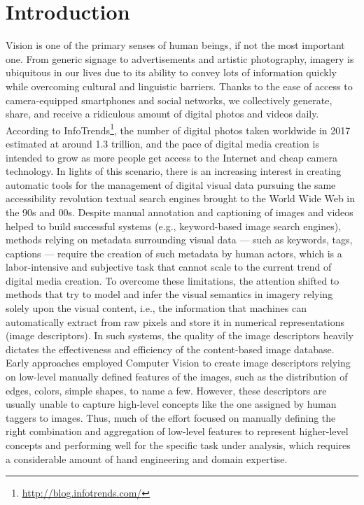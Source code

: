 
\chapter{Introduction}
\label{ch:introduction}

Vision is one of the primary senses of human beings, if not the most important one.
From generic signage to advertisements and artistic photography, imagery is ubiquitous in our lives due to its ability to convey lots of information quickly while overcoming cultural and linguistic barriers.
Thanks to the ease of access to camera-equipped smartphones and social networks, we collectively generate, share, and receive a ridiculous amount of digital photos and videos daily.
According to InfoTrends\footnote{\url{http://blog.infotrends.com/}}, the number of digital photos taken worldwide in 2017 estimated at around 1.3 trillion, and the pace of digital media creation is intended to grow as more people get access to the Internet and cheap camera technology.
In lights of this scenario, there is an increasing interest in creating automatic tools for the management of digital visual data pursuing the same accessibility revolution textual search engines brought to the World Wide Web in the 90s and 00s.
Despite manual annotation and captioning of images and videos helped to build successful systems (e.g., keyword-based image search engines), methods relying on metadata surrounding visual data --- such as keywords, tags, captions --- require the creation of such metadata by human actors, which is a labor-intensive and subjective task that cannot scale to the current trend of digital media creation.
To overcome these limitations, the attention shifted to methods that try to model and infer the visual semantics in imagery relying solely upon the visual content, i.e., the information that machines can automatically extract from raw pixels and store it in numerical representations (image descriptors).
In such systems, the quality of the image descriptors heavily dictates the effectiveness and efficiency of the content-based image database.
Early approaches employed Computer Vision to create image descriptors relying on low-level manually defined features of the images, such as the distribution of edges, colors, simple shapes, to name a few.
However, these descriptors are usually unable to capture high-level concepts like the one assigned by human taggers to images.
Thus, much of the effort focused on manually defining the right combination and aggregation of low-level features to represent higher-level concepts and performing well for the specific task under analysis, which requires a considerable amount of hand engineering and domain expertise.

